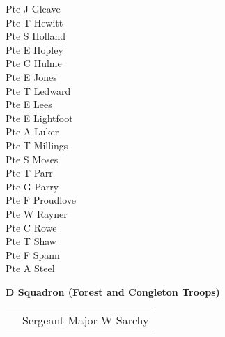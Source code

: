 \begin{multicols}{3}
  Pte J Gleave \\
  Pte T Hewitt \\
  Pte S Holland \\
  Pte E Hopley \\
  Pte C Hulme \\
  Pte E Jones \\
  Pte T Ledward \\
  Pte E Lees \\
  Pte E Lightfoot \\
  Pte A Luker \\
  Pte T Millings \\
  Pte S Moses \\
  Pte T Parr \\
  Pte G Parry \\
  Pte F Proudlove \\
  Pte W Rayner \\
  Pte C Rowe \\
  Pte T Shaw \\
  Pte F Spann \\
  Pte A Steel \\
 \end{multicols}

\vspace*{10mm}
  
\begin{center}
  \Large
  \textbf{D Squadron (Forest and Congleton Troops)}
\end{center}

\vspace*{3mm}

\begin{center}
  \begin{tabular}{rl}
    & Sergeant Major W Sarchy \\
  \end{tabular}
\end{center}

\vspace*{3mm}

